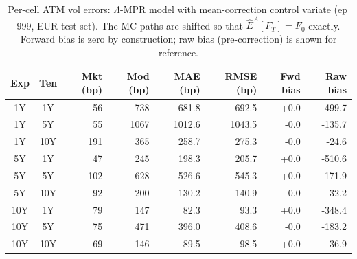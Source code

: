 \begin{table}[H]
\centering
\caption{Per-cell ATM vol errors: $\Lambda$-MPR model with mean-correction control variate (ep\,999, EUR test set). The MC paths are shifted so that $\hat{E}^A[F_T] = F_0$ exactly. Forward bias is zero by construction; raw bias (pre-correction) is shown for reference.}
\label{tab:lambda_per_cell_cv}
\small
\begin{tabular}{@{}ccrrrrrr@{}}
\toprule
\textbf{Exp} & \textbf{Ten} & \textbf{Mkt (bp)} & \textbf{Mod (bp)} & \textbf{MAE (bp)} & \textbf{RMSE (bp)} & \textbf{Fwd bias} & \textbf{Raw bias} \\
\midrule
  1Y & 1Y & 56 & 738 & 681.8 & 692.5 & +0.0 & -499.7 \\
  1Y & 5Y & 55 & 1067 & 1012.6 & 1043.5 & -0.0 & -135.7 \\
  1Y & 10Y & 191 & 365 & 258.7 & 275.3 & -0.0 & -24.6 \\
  \midrule
  5Y & 1Y & 47 & 245 & 198.3 & 205.7 & +0.0 & -510.6 \\
  5Y & 5Y & 102 & 628 & 526.6 & 545.3 & +0.0 & -171.9 \\
  5Y & 10Y & 92 & 200 & 130.2 & 140.9 & -0.0 & -32.2 \\
  \midrule
  10Y & 1Y & 79 & 147 & 82.3 & 93.3 & +0.0 & -348.4 \\
  10Y & 5Y & 75 & 471 & 396.0 & 408.6 & -0.0 & -183.2 \\
  10Y & 10Y & 69 & 146 & 89.5 & 98.5 & +0.0 & -36.9 \\
\bottomrule
\end{tabular}
\end{table}
